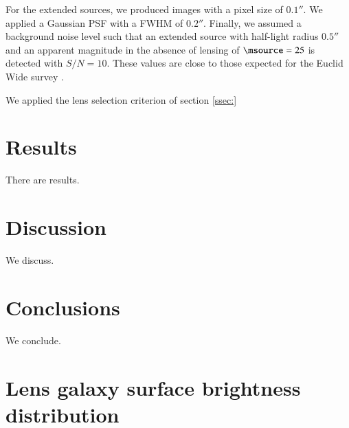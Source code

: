 \documentclass{aa}
\begin{document}
For the extended sources, we produced images with a pixel size of $0.1''$.
We applied a Gaussian PSF with a FWHM of $0.2''$.
Finally, we assumed a background noise level such that an extended source with half-light radius $0.5''$ and an apparent magnitude in the absence of lensing of $\msource=25$ is detected with $S/N=10$.
These values are close to those expected for the Euclid Wide survey \citep{Sca++22}.

We applied the lens selection criterion of section \ref{ssec:}


\section{Results}\label{sect:results}

There are results.


\section{Discussion}\label{sect:discuss}

We discuss.


\section{Conclusions}\label{sect:concl}

We conclude.








\appendix
\section{Lens galaxy surface brightness distribution}\label{sect:appendixa}
\end{document}
